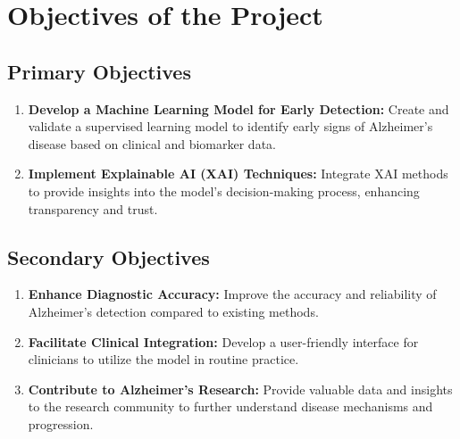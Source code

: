 \documentclass[a4paper,12pt]{report}
\begin{document}
    \section{Objectives of the Project}
    \subsection{Primary Objectives}
\begin{enumerate}
    \item\textbf{Develop a Machine Learning Model for Early Detection:}
      \newline Create and validate a supervised learning model to identify early signs of Alzheimer's disease based on clinical and biomarker data.
    \item\textbf{Implement Explainable AI (XAI) Techniques:}
       Integrate XAI methods to provide insights into the model’s decision-making process, enhancing transparency and trust.
 \end{enumerate}

    \subsection{Secondary Objectives}
\begin{enumerate}
    \item\textbf{Enhance Diagnostic Accuracy:}
       Improve the accuracy and reliability of Alzheimer's detection compared to existing methods.
    \item\textbf{Facilitate Clinical Integration:}
       Develop a user-friendly interface for clinicians to utilize the model in routine practice.
    \item\textbf{Contribute to Alzheimer's Research:}
       Provide valuable data and insights to the research community to further understand disease mechanisms and progression.
 \end{enumerate}
\end{document}
